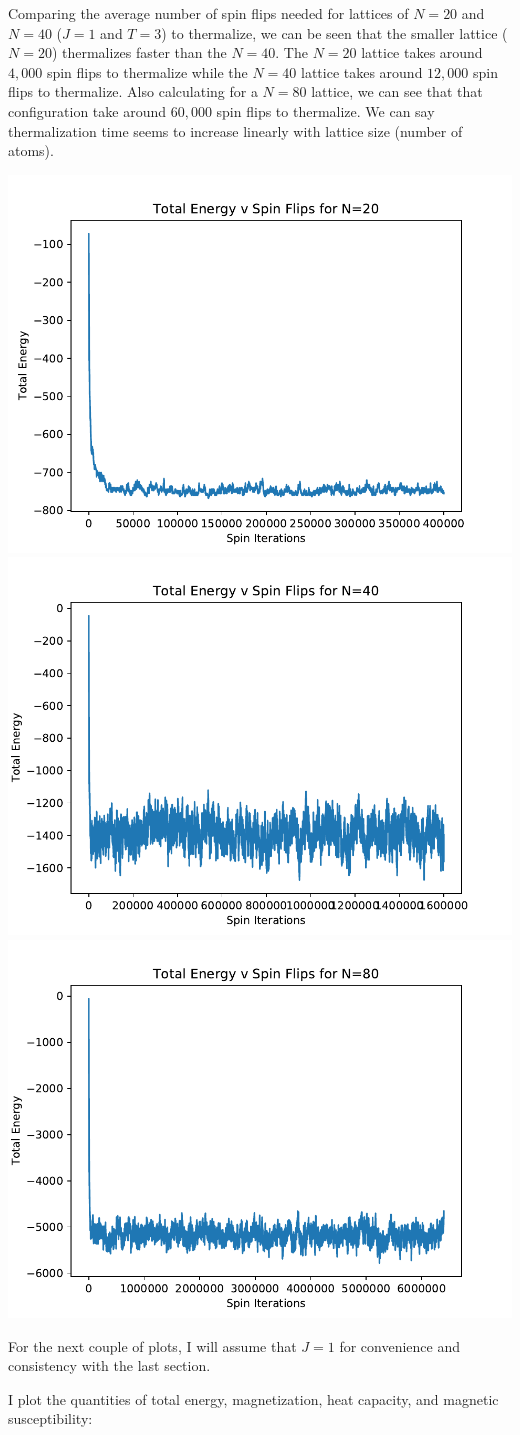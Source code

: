 \documentclass[10pt]{article} %
\begin{document}
Comparing the average number of spin flips needed for lattices of $N=20$ and $N=40$ ($J=1$ and $T=3$) to thermalize, we can be seen that the smaller lattice ($N=20$) thermalizes faster than the $N=40$. The $N=20$ lattice takes around $4,000$ spin flips to thermalize while the $N=40$ lattice takes around $12,000$ spin flips to thermalize. Also calculating for a $N=80$ lattice, we can see that that configuration take around $60,000$ spin flips to thermalize. We can say thermalization time seems to increase linearly with lattice size (number of atoms).
\begin{center}
\includegraphics[width=.3\textwidth]{../figs/q2_N20.pdf}
\includegraphics[width=.3\textwidth]{../figs/q2_N40.pdf}
\includegraphics[width=.3\textwidth]{../figs/q2_N80.pdf}
\end{center}

For the next couple of plots, I will assume that $J=1$ for convenience and consistency with the last section.

I plot the quantities of total energy, magnetization, heat capacity, and magnetic susceptibility:
\end{document}
